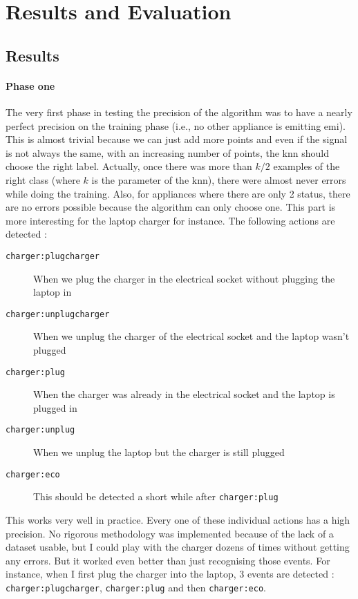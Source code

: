 \chapter{Results and Evaluation}
\section{Results}
\subsubsection{Phase one}
The very first phase in testing the precision of the algorithm was to have a nearly perfect precision on the training phase (i.e., no other appliance is emitting \acrshort{emi}). This is almost trivial because we can just add more points and even if the signal is not always the same, with an increasing number of points, the \acrshort{knn} should choose the right label. Actually, once there was more than $k/2$ examples of the right class (where $k$ is the parameter of the \acrshort{knn}), there were almost never errors while doing the training.
Also, for appliances where there are only 2 status, there are no errors possible because the algorithm can only choose one. This part is more interesting for the laptop charger for instance. The following actions are detected :
\begin{description}
\item[\texttt{charger:plugcharger}] When we plug the charger in the electrical socket without plugging the laptop in
\item[\texttt{charger:unplugcharger}] When we unplug the charger of the electrical socket and the laptop wasn't plugged
\item[\texttt{charger:plug}] When the charger was already in the electrical socket and the laptop is plugged in
\item[\texttt{charger:unplug}] When we unplug the laptop but the charger is still plugged
\item[\texttt{charger:eco}] This should be detected a short while after \texttt{charger:plug}
\end{description}

This works very well in practice. Every one of these individual actions has a high precision. No rigorous methodology was implemented because of the lack of a dataset usable, but I could play with the charger dozens of times without getting any errors. But it worked even better than just recognising those events. For instance, when I first plug the charger into the laptop, 3 events are detected : \texttt{charger:plugcharger}, \texttt{charger:plug} and then \texttt{charger:eco}.

